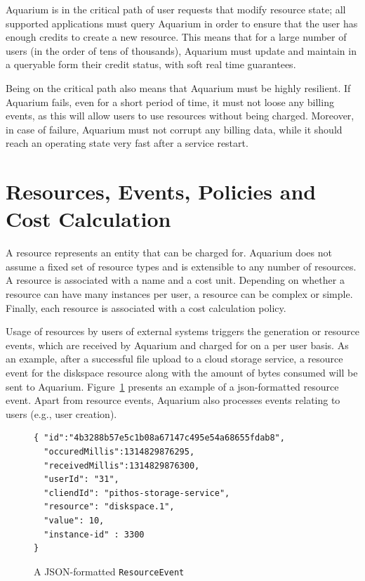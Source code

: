 \documentclass[letterpaper,twocolumn,10pt]{article}
\begin{document}
Aquarium is in the critical path of user requests that modify resource
state; all supported applications must query Aquarium in order to
ensure that the user has enough credits to create a new resource. This
means that for a large number of users (in the order of tens of thousands),
Aquarium must update and maintain in a queryable form their credit
status, with soft real time guarantees.

Being on the critical path also means that Aquarium must be highly
resilient. If Aquarium fails, even for a short period of time, it must
not loose any billing events, as this will allow users to use
resources without being charged. Moreover, in case of failure,
Aquarium must not corrupt any billing data, while it should reach an
operating state very fast after a service restart.

\section{Resources, Events, Policies and Cost Calculation}

A resource represents an entity that can be charged for. Aquarium does
not assume a fixed set of resource types and is extensible to any
number of resources. A resource is associated with a name and a cost
unit. Depending on whether a resource can have many instances per
user, a resource can be complex or simple. Finally, each resource is
associated with a cost calculation policy.

Usage of resources by users of external systems triggers the generation or
resource events, which are received by Aquarium and charged for on a per user
basis. As an example, after a successful file upload to a cloud storage
service, a resource event for the \textsf{diskspace} resource along with the
amount of bytes consumed will be sent to Aquarium.  Figure~\ref{fig:resevt}
presents an example of a {\sc json}-formatted resource event.  Apart from
resource events, Aquarium also processes events relating to users
(e.g., user creation).

\begin{figure}
\lstset{language=C, basicstyle=\footnotesize,
stringstyle=\ttfamily, 
flexiblecolumns=true, aboveskip=-0.9em, belowskip=0em, lineskip=0em}

\begin{lstlisting}
{ "id":"4b3288b57e5c1b08a67147c495e54a68655fdab8",
  "occuredMillis":1314829876295,
  "receivedMillis":1314829876300,
  "userId": "31",
  "cliendId": "pithos-storage-service",
  "resource": "diskspace.1",
  "value": 10,
  "instance-id" : 3300 
}
\end{lstlisting}
\caption{A JSON-formatted \texttt{ResourceEvent}} 
\label{fig:resevt}
\end{figure}
\end{document}
